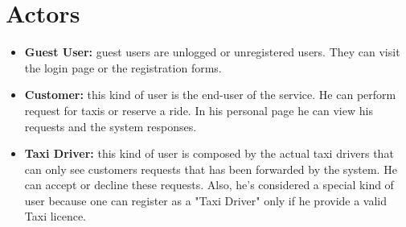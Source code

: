 \documentclass{report}
\begin{document}
\section{Actors}
\begin{itemize}
  \item \textbf{Guest User:}\label{sec:normaluser} guest users are unlogged or unregistered users. They can visit the login page or the registration forms.

  \item \textbf{Customer:}\label{sec:customer} this kind of user is the end-user of the service. He can perform request for taxis or reserve a ride. In his personal page he can view his requests and the system responses.

  \item \textbf{Taxi Driver:}\label{sec:tdriver} this kind of user is composed by the actual taxi drivers that can only see customers requests that has been forwarded by the system. He can accept or decline these requests. Also, he's considered a special kind of user because one can register as a "Taxi Driver" only if he provide a valid Taxi licence.
\end{itemize}
\end{document}

